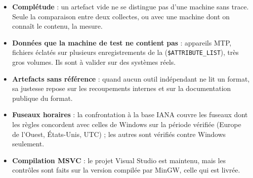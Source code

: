 \documentclass[11pt,a4paper,oneside]{report}
\begin{document}
\begin{itemize}
  \item \textbf{Complétude} : un artefact vide ne se distingue pas d'une
    machine sans trace. Seule la comparaison entre deux collectes, ou avec une
    machine dont on connaît le contenu, la mesure.
  \item \textbf{Données que la machine de test ne contient pas} :
    appareils MTP, fichiers éclatés sur plusieurs enregistrements de la
     (\texttt{\$ATTRIBUTE\_LIST}), très gros volumes. Ils sont à
    valider sur des systèmes réels.
  \item \textbf{Artefacts sans référence} : quand aucun outil indépendant ne
    lit un format, sa justesse repose sur les recoupements internes et sur la
    documentation publique du format.
  \item \textbf{Fuseaux horaires} : la confrontation à la base IANA couvre les
    fuseaux dont les règles concordent avec celles de Windows sur la période
    vérifiée (Europe de l'Ouest, États-Unis, UTC) ; les autres sont vérifiés
    contre Windows seulement.
  \item \textbf{Compilation MSVC} : le projet Visual Studio est maintenu, mais
    les contrôles sont faits sur la version compilée par MinGW, celle qui est
    livrée.
\end{itemize}
\end{document}

